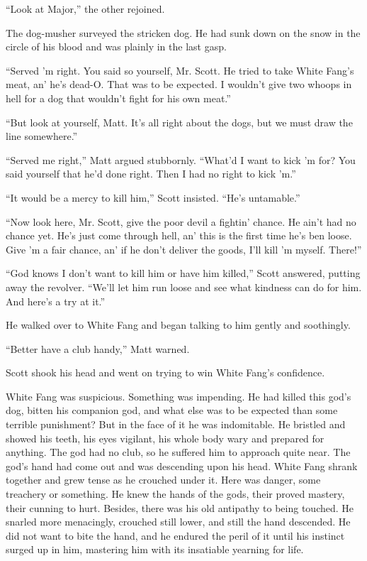 \documentclass[10pt]{book}
\begin{document}
“Look at Major,” the other rejoined.

The dog-musher surveyed the stricken dog. He had sunk down on the snow
in the circle of his blood and was plainly in the last gasp.

“Served ’m right. You said so yourself, Mr. Scott. He tried to take
White Fang’s meat, an’ he’s dead-O. That was to be expected. I wouldn’t
give two whoops in hell for a dog that wouldn’t fight for his own
meat.”

“But look at yourself, Matt. It’s all right about the dogs, but we must
draw the line somewhere.”

“Served me right,” Matt argued stubbornly. “What’d I want to kick ’m
for? You said yourself that he’d done right. Then I had no right to
kick ’m.”

“It would be a mercy to kill him,” Scott insisted. “He’s untamable.”

“Now look here, Mr. Scott, give the poor devil a fightin’ chance. He
ain’t had no chance yet. He’s just come through hell, an’ this is the
first time he’s ben loose. Give ’m a fair chance, an’ if he don’t
deliver the goods, I’ll kill ’m myself. There!”

“God knows I don’t want to kill him or have him killed,” Scott
answered, putting away the revolver. “We’ll let him run loose and see
what kindness can do for him. And here’s a try at it.”

He walked over to White Fang and began talking to him gently and
soothingly.

“Better have a club handy,” Matt warned.

Scott shook his head and went on trying to win White Fang’s confidence.

White Fang was suspicious. Something was impending. He had killed this
god’s dog, bitten his companion god, and what else was to be expected
than some terrible punishment? But in the face of it he was
indomitable. He bristled and showed his teeth, his eyes vigilant, his
whole body wary and prepared for anything. The god had no club, so he
suffered him to approach quite near. The god’s hand had come out and
was descending upon his head. White Fang shrank together and grew tense
as he crouched under it. Here was danger, some treachery or something.
He knew the hands of the gods, their proved mastery, their cunning to
hurt. Besides, there was his old antipathy to being touched. He snarled
more menacingly, crouched still lower, and still the hand descended. He
did not want to bite the hand, and he endured the peril of it until his
instinct surged up in him, mastering him with its insatiable yearning
for life.
\end{document}
